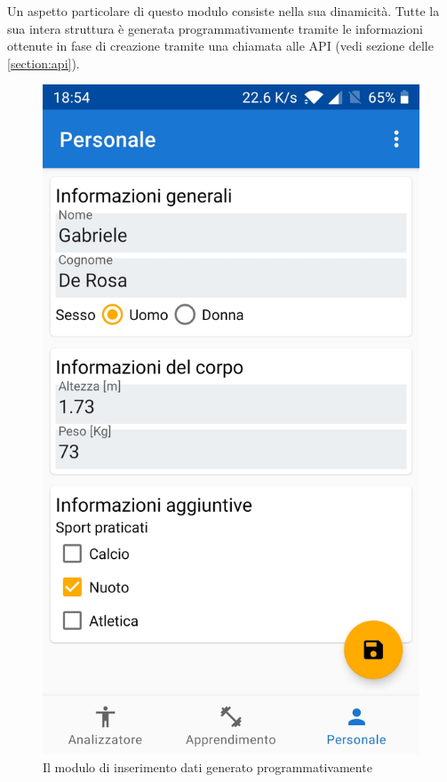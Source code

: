 Un aspetto particolare di questo modulo consiste nella sua dinamicità. Tutte la sua intera struttura è generata programmativamente 
tramite le informazioni ottenute in fase di creazione tramite una chiamata alle API (vedi sezione delle \ref{section:api}).

\begin{figure}[H]
    \centering
    \includegraphics[scale = 0.10]{assets/images/screenshots/3a_Init.jpg}    
    \caption{Il modulo di inserimento dati generato programmativamente}
    \label{fig:screenshots_personal}
\end{figure}


